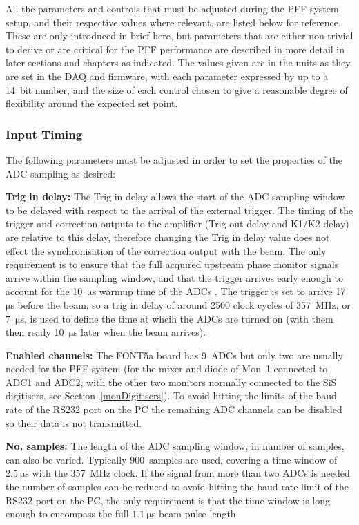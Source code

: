 All the parameters and controls that must be adjusted during the PFF system setup, and their respective values where relevant, are listed below for reference. These are only introduced in brief here, but parameters that are either non-trivial to derive or are critical for the PFF performance are described in more detail in later sections and chapters as indicated. The values given are in the units as they are set in the DAQ and firmware, with each parameter expressed by up to a 14~bit number, and the size of each control chosen to give a reasonable degree of flexibility around the expected set point. 

\subsubsection{Input Timing}

The following parameters must be adjusted in order to set the properties of the ADC sampling as desired:

\textbf{Trig in delay:} The Trig in delay allows the start of the ADC sampling window to be delayed with respect to the arrival of the external trigger. The timing of the trigger and correction outputs to the amplifier (Trig out delay and K1/K2 delay) are relative to this delay, therefore changing the Trig in delay value does not effect the synchronisation of the correction output with the beam. The only requirement is to ensure that the full acquired upstream phase monitor signals arrive within the sampling window, and that the trigger arrives early enough to account for the 10~\(\mathrm{\mu}\)s warmup time of the ADCs \cite{glennPriv}. The trigger is set to arrive 17~\(\mathrm{\mu}\)s before the beam, so a trig in delay of around 2500 clock cycles of 357~MHz, or 7~\(\mathrm{\mu}\)s, is used to define the time at whcih the ADCs are turned on (with them then ready 10~\(\mathrm{\mu}\)s later when the beam arrives).

\textbf{Enabled channels:} The FONT5a board has 9~ADCs but only two are usually needed for the PFF system (for the mixer and diode of Mon~1 connected to ADC1 and ADC2, with the other two monitors normally connected to the SiS digitisers, see Section~\ref{monDigitisers}). To avoid hitting the limits of the baud rate  of the RS232 port on the PC the remaining ADC channels can be disabled so their data is not transmitted.

\textbf{No. samples:} The length of the ADC sampling window, in number of samples, can also be varied. Typically 900~samples are used, covering a time window of \(2.5~\mathrm{\mu}\)s with the 357~MHz clock. If the signal from more than two ADCs is needed the number of samples can be reduced to avoid hitting the baud rate limit of the RS232 port on the PC, the only requirement is that the time window is long enough to encompass the full \(1.1~\mathrm{\mu}\)s beam pulse length.

